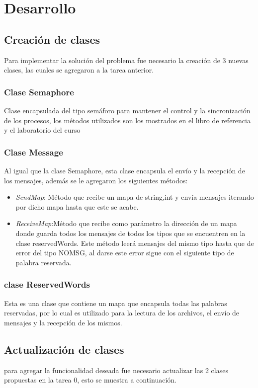 \section[Desarrollo]{Desarrollo}
\subsection{Creación de clases}
Para implementar la solución del problema fue necesario la creación de 3 nuevas clases, las cuales se agregaron a la tarea anterior. 
\subsubsection{Clase Semaphore}
Clase encapsulada del tipo semáforo para mantener el control y la sincronización de los procesos, los métodos utilizados son los mostrados en el libro de referencia y el laboratorio del curso
\subsubsection{Clase Message}
  Al igual que la clase Semaphore, esta clase encapsula el envío y la recepción de los mensajes, además se le agregaron los siguientes métodos:
  \begin{itemize}
    \item \emph{SendMap}: Método que recibe un mapa de string,int y envía mensajes iterando por dicho mapa hasta que este se acabe.
    \item \emph{ReceiveMap}:Método que recibe como parámetro la dirección de un mapa donde guarda todos los mensajes de todos los tipos que se encuentren en la clase reservedWords. Este método leerá mensajes del mismo tipo hasta que de error del tipo NOMSG, al darse este error sigue con el siguiente tipo de palabra reservada.
  \end{itemize}
  \subsubsection{clase ReservedWords}
    Esta es una clase que contiene un mapa que encapsula todas las palabras reservadas, por lo cual es utilizado para la lectura de los archivos, el envío de mensajes y la recepción de los mismos.
    
\subsection[Actualización de Clases]{Actualización de clases}
para agregar la funcionalidad deseada fue necesario actualizar las 2 clases propuestas en la tarea 0, esto se muestra a continuación.

